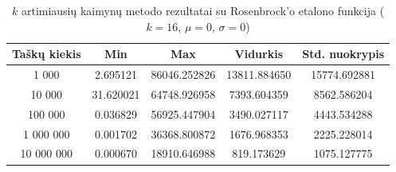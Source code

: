 \begin{table}[H]
    \centering
    \begin{tabular}{|c|c|c|c|c|}
        \hline
        \textbf{Taškų kiekis} & \textbf{Min} & \textbf{Max} & \textbf{Vidurkis} & \textbf{Std. nuokrypis} \\ \hline
        1 000        & 2.695121 & 86046.252826 & 13811.884650 & 15774.692881 \\ \hline
        10 000       & 31.620021 & 64748.926958 & 7393.604359 & 8562.586204 \\ \hline
        100 000      & 0.036829 & 56925.447904 & 3490.027117 & 4443.534288 \\ \hline
        1 000 000    & 0.001702 & 36368.800872 & 1676.968353 & 2225.228014 \\ \hline
        10 000 000   & 0.000670 & 18910.646988 & 819.173629 & 1075.127775 \\ \hline
    \end{tabular}
    \caption{$k$ artimiausių kaimynų metodo rezultatai su Rosenbrock'o etalono funkcija ($k = 16$, $\mu = 0$, $\sigma = 0$)}
\end{table}